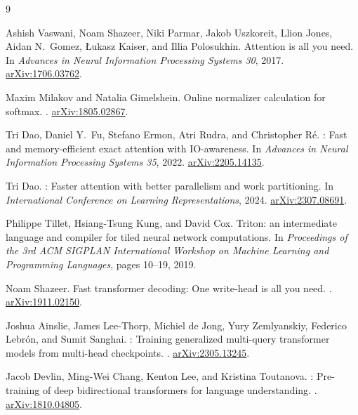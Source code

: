 \documentclass[11pt]{amsart}
\theoremstyle{plain}
\theoremstyle{definition}
\begin{document}
\begin{thebibliography}{9}

Ashish Vaswani, Noam Shazeer, Niki Parmar, Jakob Uszkoreit, Llion Jones,
Aidan N.\ Gomez, {\L}ukasz Kaiser, and Illia Polosukhin.
\newblock Attention is all you need.
\newblock In \emph{Advances in Neural Information Processing Systems 30}, 2017.
\newblock \href{https://arxiv.org/abs/1706.03762}{arXiv:1706.03762}.

Maxim Milakov and Natalia Gimelshein.
\newblock Online normalizer calculation for softmax.
.
\newblock \href{https://arxiv.org/abs/1805.02867}{arXiv:1805.02867}.

Tri Dao, Daniel Y.\ Fu, Stefano Ermon, Atri Rudra, and Christopher R\'{e}.
: Fast and memory-efficient exact attention with
  {IO}-awareness.
\newblock In \emph{Advances in Neural Information Processing Systems 35},
  2022.
\newblock \href{https://arxiv.org/abs/2205.14135}{arXiv:2205.14135}.

Tri Dao.
: Faster attention with better parallelism and
  work partitioning.
\newblock In \emph{International Conference on Learning Representations}, 2024.
\newblock \href{https://arxiv.org/abs/2307.08691}{arXiv:2307.08691}.

Philippe Tillet, Hsiang-Tsung Kung, and David Cox.
\newblock Triton: an intermediate language and compiler for tiled neural
  network computations.
\newblock In \emph{Proceedings of the 3rd ACM SIGPLAN International Workshop
  on Machine Learning and Programming Languages}, pages 10--19, 2019.

Noam Shazeer.
\newblock Fast transformer decoding: One write-head is all you need.
.
\newblock \href{https://arxiv.org/abs/1911.02150}{arXiv:1911.02150}.

Joshua Ainslie, James Lee-Thorp, Michiel de Jong, Yury Zemlyanskiy,
Federico Lebr\'{o}n, and Sumit Sanghai.
: Training generalized multi-query transformer models from
  multi-head checkpoints.
.
\newblock \href{https://arxiv.org/abs/2305.13245}{arXiv:2305.13245}.

Jacob Devlin, Ming-Wei Chang, Kenton Lee, and Kristina Toutanova.
: Pre-training of deep bidirectional transformers for
  language understanding.
.
\newblock \href{https://arxiv.org/abs/1810.04805}{arXiv:1810.04805}.


\end{thebibliography}
\end{document}
